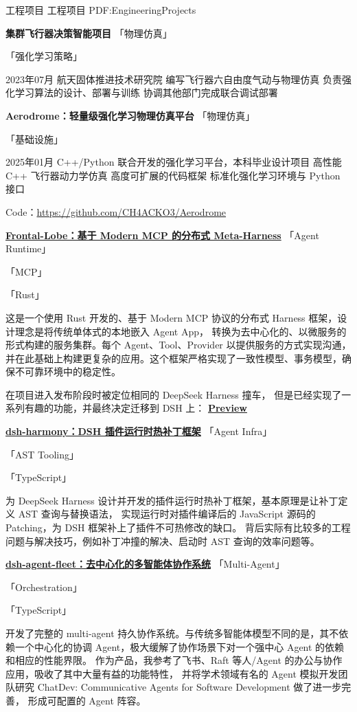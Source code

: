 \documentclass[letterpaper,MMMyyyy,nonstopmode]{simpleresumecv}
\renewcommand{\BigGap}{\par\vspace{2.8mm}\par}
\renewcommand{\DatestampYM}[2]{\mbox{#1年#2月}}
\newcommand{\ProjectTag}[1]{%
  \nobreak\hspace{0.35em}%
  {\normalfont\CVHeadingCJK
   \fontsize{7.8pt}{9.4pt}\selectfont
   \color{black!58}「#1」}%
}
\begin{document}
\begin{Body}

\Section
{工程项目}
{工程项目}
{PDF:EngineeringProjects}

\BigGap
\Entry
\textbf{集群飞行器决策智能项目}
\ProjectTag{物理仿真}
\ProjectTag{强化学习策略}
\hfill
\DatestampYM{2023}{07}
\newline
航天固体推进技术研究院
\BulletItem
编写飞行器六自由度气动与物理仿真
\BulletItem
负责强化学习算法的设计、部署与训练
\BulletItem
协调其他部门完成联合调试部署

\BigGap
\Entry
\textbf{Aerodrome：轻量级强化学习物理仿真平台}
\ProjectTag{物理仿真}
\ProjectTag{基础设施}
\hfill
\DatestampYM{2025}{01}
\newline
C++/Python 联合开发的强化学习平台，本科毕业设计项目
\BulletItem
高性能 C++ 飞行器动力学仿真
\SubBulletItem
高度可扩展的代码框架
\SubBulletItem
标准化强化学习环境与 Python 接口

Code：\url{https://github.com/CH4ACKO3/Aerodrome}

\BigGap
\Entry
\href{https://github.com/CH4AcKO3/Frontal-Lobe}{\textbf{Frontal-Lobe：基于 Modern MCP 的分布式 Meta-Harness}}
\ProjectTag{Agent Runtime}
\ProjectTag{MCP}
\ProjectTag{Rust}
\newline
这是一个使用 Rust 开发的、基于 Modern MCP 协议的分布式 Harness 框架，设计理念是将传统单体式的本地嵌入 Agent App，
转换为去中心化的、以微服务的形式构建的服务集群。每个 Agent、Tool、Provider 以提供服务的方式实现沟通，
并在此基础上构建更复杂的应用。这个框架严格实现了一致性模型、事务模型，确保不可靠环境中的稳定性。

在项目进入发布阶段时被定位相同的 DeepSeek Harness 撞车，
但是已经实现了一系列有趣的功能，并最终决定迁移到 DSH 上：
\href{https://icn07qje5tl4.feishu.cn/wiki/NLGAwkXpsicdGgk6hnoc0vRknDf?from=from_copylink}{\textbf{Preview}}


\BigGap
\Entry
\href{https://github.com/memorax-ai/dsh-harmony}{\textbf{dsh-harmony：DSH 插件运行时热补丁框架}}
\ProjectTag{Agent Infra}
\ProjectTag{AST Tooling}
\ProjectTag{TypeScript}
\newline
为 DeepSeek Harness 设计并开发的插件运行时热补丁框架，基本原理是让补丁定义 AST 查询与替换语法，
实现运行时对插件编译后的 JavaScript 源码的 Patching，为 DSH 框架补上了插件不可热修改的缺口。
背后实际有比较多的工程问题与解决技巧，例如补丁冲撞的解决、启动时 AST 查询的效率问题等。

\BigGap
\Entry
\href{https://github.com/CH4AcKO3/dsh-agent-fleet}{\textbf{dsh-agent-fleet：去中心化的多智能体协作系统}}
\ProjectTag{Multi-Agent}
\ProjectTag{Orchestration}
\ProjectTag{TypeScript}
\newline
开发了完整的 multi-agent 持久协作系统。与传统多智能体模型不同的是，其不依赖一个中心化的协调 Agent，极大缓解了协作场景下对一个强中心 Agent 的依赖和相应的性能界限。
作为产品，我参考了飞书、Raft 等人/Agent 的办公与协作应用，吸收了其中大量有益的功能特性，
并将学术领域有名的 Agent 模拟开发团队研究 ChatDev: Communicative Agents for Software Development 做了进一步完善，
形成可配置的 Agent 阵容。


\end{Body}
\end{document}
